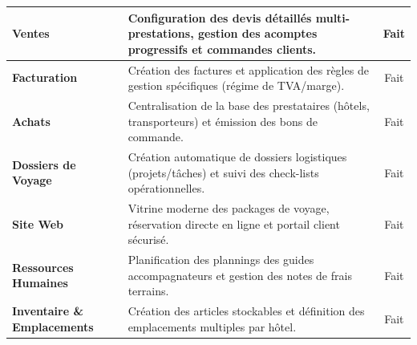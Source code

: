 \documentclass[11pt,a4paper]{report}
\begin{document}
\begin{longtable}{|p{3cm}|p{8.5cm}|c|}
    \textbf{Ventes} & Configuration des devis détaillés multi-prestations, gestion des acomptes progressifs et commandes clients. & Fait \\ \hline
    
    \textbf{Facturation} & Création des factures et application des règles de gestion spécifiques (régime de TVA/marge). & Fait \\ \hline
    
    \textbf{Achats} & Centralisation de la base des prestataires (hôtels, transporteurs) et émission des bons de commande. & Fait \\ \hline
    
    \textbf{Dossiers de Voyage} & Création automatique de dossiers logistiques (projets/tâches) et suivi des check-lists opérationnelles. & Fait \\ \hline
    
    \textbf{Site Web} & Vitrine moderne des packages de voyage, réservation directe en ligne et portail client sécurisé. & Fait \\ \hline
    
    \textbf{Ressources Humaines} & Planification des plannings des guides accompagnateurs et gestion des notes de frais terrains. & Fait \\ \hline

    \textbf{Inventaire \& Emplacements} & Création des articles stockables et définition des emplacements multiples par hôtel. & Fait \\ \hline

\end{longtable}
\endgroup
\end{document}
